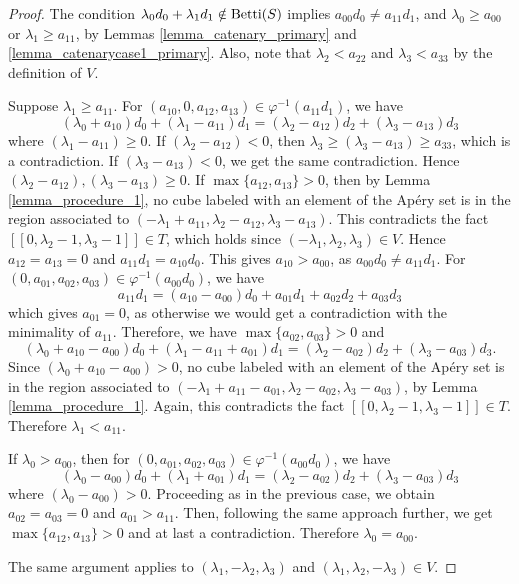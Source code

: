 \documentclass[12pt]{article}
\theoremstyle{remark}
\begin{document}
\begin{proof}

The condition $\lambda_0d_0 + \lambda_1d_1 \notin \textup{Betti}(S)$ implies $a_{00}d_0 \neq a_{11}d_1$, and $\lambda_0 \geq a_{00}$ or $\lambda_1 \geq a_{11}$, by Lemmas \ref{lemma_catenary_primary} and \ref{lemma_catenarycase1_primary}. Also, note that $\lambda_2< a_{22} $ and $\lambda_3 < a_{33} $ by the definition of $V$.

Suppose $\lambda_1 \geq a_{11}$. For $(a_{10},0,a_{12},a_{13}) \in \varphi^{-1}(a_{11}d_1)$, we have
\begin{equation}
     (\lambda_0+a_{10})d_0 + (\lambda_1-a_{11})d_1 =  (\lambda_2-a_{12})d_2 + (\lambda_3-a_{13})d_3
\end{equation}
where $(\lambda_1-a_{11}) \geq 0$. 
If $(\lambda_2-a_{12}) < 0$, then $\lambda_3 \geq (\lambda_3-a_{13}) \geq a_{33}$, which is a contradiction. If $(\lambda_3-a_{13}) < 0$, we get the same contradiction. Hence $(\lambda_2-a_{12}),(\lambda_3-a_{13}) \geq 0$.
If $\max \{a_{12},a_{13}\} > 0$, then by Lemma \ref{lemma_procedure_1}, no cube labeled with an element of the Ap{\'e}ry set is in the region associated to $(-\lambda_1+a_{11},\lambda_2-a_{12},\lambda_3-a_{13})$. This contradicts the fact $[[0,\lambda_2-1,\lambda_3-1]] \in T$, which holds since $(-\lambda_1,\lambda_2,\lambda_3) \in V$. 
Hence $a_{12} =a_{13}= 0$ and $a_{11}d_1 = a_{10}d_0$. This gives $a_{10} > a_{00}$, as $a_{00}d_0 \neq a_{11}d_1$. For $(0,a_{01},a_{02},a_{03}) \in \varphi^{-1}(a_{00}d_0)$, we have
\begin{equation}
    a_{11}d_1 = (a_{10}-a_{00})d_0 + a_{01}d_1 + a_{02}d_2 + a_{03}d_3
\end{equation}
which gives $a_{01} = 0$, as otherwise we would get a contradiction with the minimality of $a_{11}$. Therefore, we have $\max \{ a_{02},a_{03}\} > 0$ and
\begin{equation}
    (\lambda_0+a_{10}-a_{00})d_0 + (\lambda_1-a_{11} + a_{01})d_1 =  (\lambda_2-a_{02})d_2 + (\lambda_3-a_{03})d_3.
\end{equation}
Since $(\lambda_0+a_{10}-a_{00}) > 0$, no cube labeled with an element of the Ap{\'e}ry set is in the region associated to $(-\lambda_1+a_{11} - a_{01},\lambda_2-a_{02},\lambda_3-a_{03})$, by Lemma \ref{lemma_procedure_1}. Again, this contradicts the fact $[[0,\lambda_2-1,\lambda_3-1]] \in T$. Therefore $\lambda_1 <a_{11}$. 

If $\lambda_0 > a_{00}$, then for $(0,a_{01},a_{02},a_{03}) \in \varphi^{-1}(a_{00}d_0)$, we have
\begin{equation}
     (\lambda_0-a_{00})d_0 + (\lambda_1+a_{01})d_1 =  (\lambda_2-a_{02})d_2 + (\lambda_3-a_{03})d_3
\end{equation} 
where $(\lambda_0-a_{00}) > 0$. Proceeding as in the previous case, we obtain $a_{02}=a_{03}=0$ and $a_{01} > a_{11}$. Then, following the same approach further, we get $\max \{a_{12},a_{13}\} > 0$ and at last a contradiction. Therefore $\lambda_0 = a_{00}$.

The same argument applies to $(\lambda_1,-\lambda_2,\lambda_3)$ and $(\lambda_1,\lambda_2,-\lambda_3) \in V$.
\end{proof}
\end{document}
